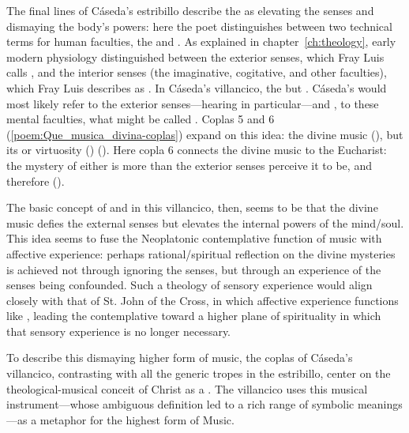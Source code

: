 The final lines of Cáseda's estribillo describe the  as elevating the senses and dismaying the body's powers: here the poet distinguishes between two technical terms for human faculties, the  and .
As explained in chapter~\ref{ch:theology}, early modern physiology distinguished between the exterior senses, which Fray Luis calls , and the interior senses (the imaginative, cogitative, and other faculties), which Fray Luis describes as .
In Cáseda's villancico, the   but .
Cáseda's  would most likely refer to the exterior senses---hearing in particular---and , to these mental faculties, what might be called .
Coplas 5 and 6 (\cref{poem:Que_musica_divina-coplas}) expand on this idea: the divine music  (), but its  or virtuosity ()  ().
Here copla 6 connects the divine music to the Eucharist: the mystery of either is more than the exterior senses perceive it to be, and therefore  ().

The basic concept of  and  in this villancico, then, seems to be that the divine music defies the external senses but elevates the internal powers of the mind/soul.
This idea seems to fuse the Neoplatonic contemplative function of music with affective experience: perhaps rational/spiritual reflection on the divine mysteries is achieved not through ignoring the senses, but through an experience of the senses being confounded.
Such a theology of sensory experience would align closely with that of St. John of the Cross, in which affective experience functions like , leading the contemplative toward a higher plane of spirituality in which that sensory experience is no longer necessary.

To describe this dismaying higher form of music, the coplas of Cáseda's villancico, contrasting with all the generic tropes in the estribillo, center on the theological-musical conceit of Christ as a .
The villancico uses this musical instrument---whose ambiguous definition led to a rich range of symbolic meanings---as a metaphor for the highest form of Music.

